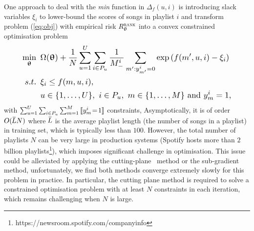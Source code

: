 One approach to deal with the \emph{min} function in $\Delta_f(u, i)$ is introducing 
slack variables $\xi_i$ to lower-bound the scores of songs in playlist $i$ %
and 
transform problem (\ref{eq:obj}) with empirical risk $R_{\uptheta}^{\textsc{rank}}$ into a convex constrained optimisation problem %
\begin{equation}
\label{eq:expobj_cons}
\resizebox{.888\linewidth}{!}{$\displaystyle
\begin{aligned}
\min_{\upthetabm} \ \, & 
\Omega(\upthetabm) + \frac{1}{N} \sum_{u=1}^U \sum_{i \in P_u} \frac{1}{M_-^i} \sum_{m': y_{m'}^i = 0} \exp \left( f(m', u, i) - \xi_i \right) \\
s.t. \ \, & 
\xi_i \le f(m, u, i), \\
& u \in \{1,\dots,U\}, \ i \in P_u, \ m \in \{1,\dots,M\} \ \text{and} \ y_m^i = 1,
\end{aligned}
$}
\end{equation}
%
with
$
\sum_{u=1}^U \sum_{i \in P_u} \sum_{m=1}^M \, \llbracket y_m^i \!= \!1 \rrbracket
$
constraints,
\ie {}
Asymptotically, it is of order {\small $O(\widebar{L} N)$} where {\small $\widebar{L}$} 
is the average playlist length (\ie the number of songs in a playlist) in training set,
which is typically less than $100$.
However,
the total number of playlists {\small $N$} can be very large in production systems 
(\eg Spotify hosts more than $2$ billion playlists\footnote{https://newsroom.spotify.com/companyinfo}),
which imposes significant challenge in optimisation. 
%
This issue could be alleviated by applying the cutting-plane~\cite{avriel2003nonlinear} method or the sub-gradient method,
unfortunately, we find both methods converge extremely slowly for this problem in practice.
In particular, the cutting plane method is required to solve 
a constrained optimisation problem with at least {\small $N$} constraints in each iteration, 
which remains challenging when {\small $N$} is large.

